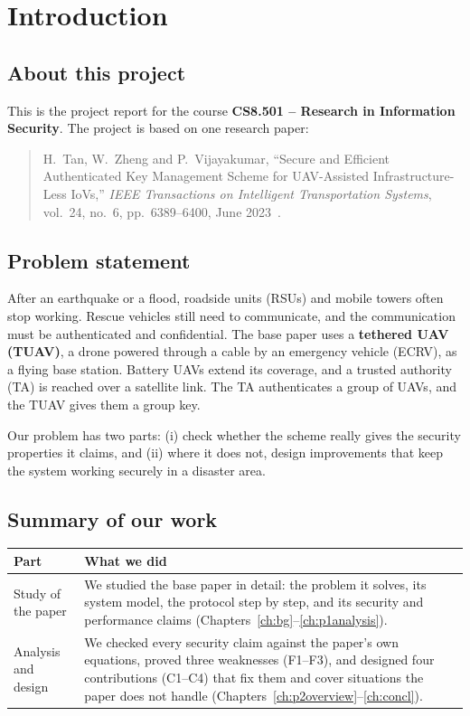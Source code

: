 \chapter{Introduction}\label{ch:intro}
\section{About this project}
This is the project report for the course \textbf{CS8.501 -- Research in Information Security}. The project is based on one research paper:
\begin{quote}
H.~Tan, W.~Zheng and P.~Vijayakumar, ``Secure and Efficient Authenticated Key Management Scheme for UAV-Assisted Infrastructure-Less IoVs,''
\emph{IEEE Transactions on Intelligent Transportation Systems}, vol.~24, no.~6, pp.~6389--6400, June 2023~\cite{tan2023}.
\end{quote}

\section{Problem statement}
After an earthquake or a flood, roadside units (RSUs) and mobile towers often stop working. Rescue vehicles still need to communicate, and the
communication must be authenticated and confidential. The base paper uses a \textbf{tethered UAV (TUAV)}, a drone powered through a cable by an
emergency vehicle (ECRV), as a flying base station. Battery UAVs extend its coverage, and a trusted authority (TA) is reached over a satellite link.
The TA authenticates a group of UAVs, and the TUAV gives them a group key.

Our problem has two parts: (i) check whether the scheme really gives the security properties it claims, and (ii) where it does not, design
improvements that keep the system working securely in a disaster area.

\section{Summary of our work}
\begin{center}
\begin{tabularx}{\linewidth}{@{}p{3.2cm} X@{}}
\toprule
\textbf{Part} & \textbf{What we did}\\
\midrule
Study of the paper & We studied the base paper in detail: the problem it solves, its system model, the protocol step by step, and its security and
performance claims (Chapters~\ref{ch:bg}--\ref{ch:p1analysis}).\\
Analysis and design & We checked every security claim against the paper's own equations, proved three weaknesses (F1--F3), and designed four
contributions (C1--C4) that fix them and cover situations the paper does not handle (Chapters~\ref{ch:p2overview}--\ref{ch:concl}).\\
\bottomrule
\end{tabularx}
\end{center}

